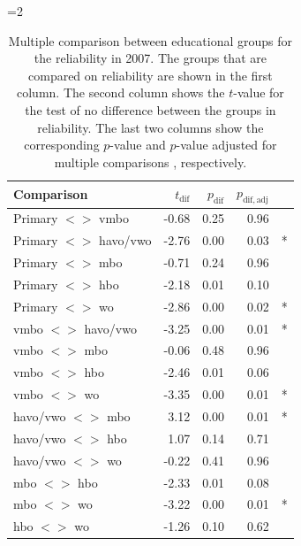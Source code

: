 \documentclass[a4paper, 11pt]{article}
\newcommand{\0}{\boldsymbol{0}}
\begin{document}
=2
\begin{table}[ht]
\begin{center}
\begin{tabular}{lrrrl}
  \hline  \hline
 Comparison & $t_{\mathrm{dif}}$ & $p_{\mathrm{dif}}$ & $p_{\mathrm{dif,adj}}$ &  \\ 
  \hline
Primary $<$$>$ vmbo & -0.68 & 0.25 & 0.96 &  \\ 
Primary $<$$>$ havo/vwo & -2.76 & 0.00 & 0.03 & * \\ 
Primary $<$$>$ mbo & -0.71 & 0.24 & 0.96 &  \\ 
Primary $<$$>$ hbo & -2.18 & 0.01 & 0.10 &  \\ 
Primary $<$$>$ wo & -2.86 & 0.00 & 0.02 & * \\ 
vmbo $<$$>$ havo/vwo & -3.25 & 0.00 & 0.01 & * \\ 
vmbo $<$$>$ mbo & -0.06 & 0.48 & 0.96 &  \\ 
vmbo $<$$>$ hbo & -2.46 & 0.01 & 0.06 &  \\ 
vmbo $<$$>$ wo & -3.35 & 0.00 & 0.01 & * \\ 
 havo/vwo $<$$>$ mbo & 3.12 & 0.00 & 0.01 & * \\ 
 havo/vwo $<$$>$ hbo & 1.07 & 0.14 & 0.71 &  \\ 
 havo/vwo $<$$>$ wo & -0.22 & 0.41 & 0.96 &  \\ 
 mbo $<$$>$ hbo & -2.33 & 0.01 & 0.08 &  \\ 
 mbo $<$$>$ wo & -3.22 & 0.00 & 0.01 & * \\ 
 hbo $<$$>$ wo & -1.26 & 0.10 & 0.62 &  \\ 
   \hline  \hline
\end{tabular}\caption{Multiple comparison between educational groups for the reliability in 2007. 
	The groups that are compared on reliability are shown in the first column. The second column shows the
	$t$-value for the test of no difference between the groups in reliability. The last two columns show 
	the corresponding $p$-value and $p$-value adjusted for multiple comparisons \citep{holm1979simple}, respectively.}\label{tab:tests}
\end{center}
\end{table}
\fi
\end{document}
